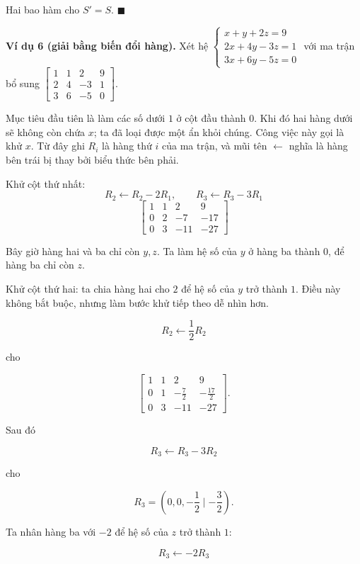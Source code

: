 \documentclass[12pt,a4paper]{article}
\begin{document}
Hai bao hàm cho \(S'=S\). \(\blacksquare\)

\textbf{Ví dụ 6 (giải bằng biến đổi hàng).} Xét hệ $\begin{cases} x + y + 2z = 9 \\ 2x + 4y - 3z = 1 \\ 3x + 6y - 5z = 0 \end{cases}$ với ma trận bổ sung $\left[ \begin{array}{ccc|c} 1 & 1 & 2 & 9 \\ 2 & 4 & -3 & 1 \\ 3 & 6 & -5 & 0 \end{array} \right]$.

Mục tiêu đầu tiên là làm các số dưới \(1\) ở cột đầu thành \(0\). Khi đó hai hàng dưới sẽ không còn chứa \(x\); ta đã loại được một ẩn khỏi chúng. Công việc này gọi là khử \(x\). Từ đây ghi \(R_i\) là hàng thứ \(i\) của ma trận, và mũi tên \(\leftarrow\) nghĩa là hàng bên trái bị thay bởi biểu thức bên phải.

Khử cột thứ nhất:
$$ R_2\leftarrow R_2-2R_1,\qquad R_3\leftarrow R_3-3R_1 $$
$$
\left[ \begin{array}{ccc|c} 1 & 1 & 2 & 9 \\ 0 & 2 & -7 & -17 \\ 0 & 3 & -11 & -27 \end{array} \right]
$$

Bây giờ hàng hai và ba chỉ còn \(y,z\). Ta làm hệ số của \(y\) ở hàng ba thành \(0\), để hàng ba chỉ còn \(z\).

Khử cột thứ hai: ta chia hàng hai cho \(2\) để hệ số của \(y\) trở thành \(1\). Điều này không bắt buộc, nhưng làm bước khử tiếp theo dễ nhìn hơn.

$$ R_2\leftarrow \frac12R_2 $$

cho

$$
\left[ \begin{array}{ccc|c} 1 & 1 & 2 & 9 \\ 0 & 1 & -\frac72 & -\frac{17}{2} \\ 0 & 3 & -11 & -27 \end{array} \right].
$$

Sau đó

$$ R_3\leftarrow R_3-3R_2 $$

cho

$$ R_3= \left(0,0,-\frac12\mid-\frac32\right). $$

Ta nhân hàng ba với \(-2\) để hệ số của \(z\) trở thành \(1\):

$$ R_3\leftarrow-2R_3 $$
\end{document}
